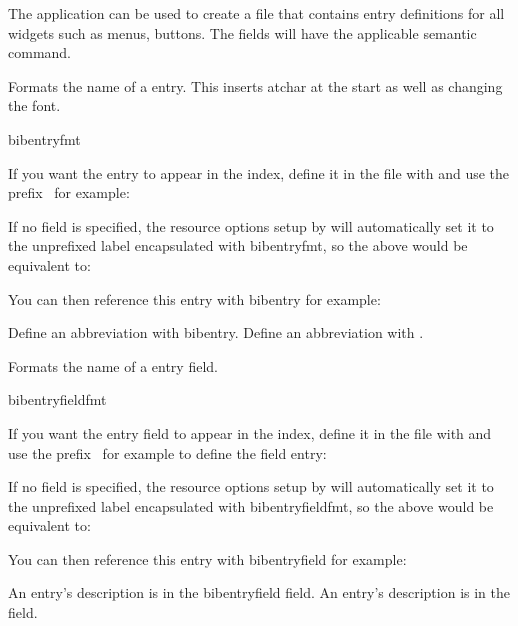 \documentclass[toc=listof]{scrreport}
\begin{document}
The  application can be used to create a 
file that contains entry definitions for all widgets such as menus, buttons.
The  fields will have the
applicable semantic command.

Formats the name of a  entry. This inserts \gls{atchar} at
the start  as well as changing the font.
\begin{coderesult}
\gls{bibentryfmt}
\tcblower
{}
\end{coderesult}

If you want the entry to appear in the index, define it
in the  file with  and use the
prefix \ for example:
\begin{codebox}
\end{codebox}
If no  field is specified, the resource options setup by
 will automatically set it to the unprefixed label
encapsulated with \gls{bibentryfmt}, so the above would be equivalent to:
\begin{codebox}
\end{codebox}
You can then reference this entry with \gls{bibentry} for example:
\begin{coderesult}
Define an abbreviation with
\gls{bibentry}.
\tcblower
Define an abbreviation with
.
\end{coderesult}

Formats the name of a  entry field.
\begin{coderesult}
\gls{bibentryfieldfmt}
\tcblower
{}
\end{coderesult}

If you want the entry field to appear in the index, define it
in the  file with  and use the
prefix \ for example to define the
 field entry:
\begin{codebox}
\end{codebox}
If no  field is specified, the resource options setup by
 will automatically set it to the unprefixed label
encapsulated with \gls{bibentryfieldfmt}, so the above would be equivalent to:
\begin{codebox}
\end{codebox}
You can then reference this entry with \gls{bibentryfield} for example:
\begin{coderesult}
An entry's description is in the
\gls{bibentryfield}
field.
\tcblower
An entry's description is in the
field.
\end{coderesult}
\end{document}
